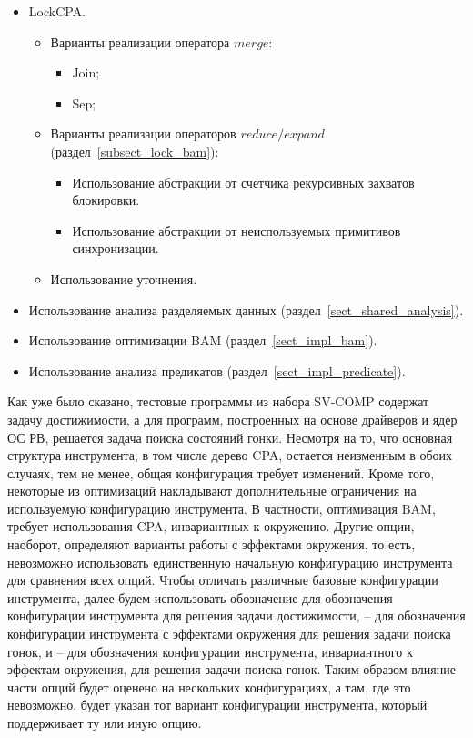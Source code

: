 \begin{itemize}
\item LockCPA.
\begin{itemize}
\item Варианты реализации оператора $merge$:
\begin{itemize}
\item Join;
\item Sep;
\end{itemize}
\item Варианты реализации операторов $reduce/expand$ (раздел~\ref{subsect_lock_bam}):
\begin{itemize}
\item Использование абстракции от счетчика рекурсивных захватов блокировки.
\item Использование абстракции от неиспользуемых примитивов синхронизации.
\end{itemize}
\item Использование уточнения.
\end{itemize}
\item Использование анализа разделяемых данных (раздел~\ref{sect_shared_analysis}).
\item Использование оптимизации BAM (раздел~\ref{sect_impl_bam}).
\item Использование анализа предикатов (раздел~\ref{sect_impl_predicate}).
\end{itemize}

Как уже было сказано, тестовые программы из набора SV-COMP содержат задачу достижимости, а для программ, построенных на основе драйверов и ядер ОС РВ, решается задача поиска состояний гонки.
Несмотря на то, что основная структура инструмента, в том числе дерево CPA, остается неизменным в обоих случаях, тем не менее, общая конфигурация требует изменений.
Кроме того, некоторые из оптимизаций накладывают дополнительные ограничения на используемую конфигурацию инструмента.
В частности, оптимизация BAM, требует использования CPA, инвариантных к окружению.
Другие опции, наоборот, определяют варианты работы с эффектами окружения, то есть, невозможно использовать единственную начальную конфигурацию инструмента для сравнения всех опций.
Чтобы отличать различные базовые конфигурации инструмента, далее будем использовать обозначение \textit{\theory} для обозначения конфигурации инструмента для решения задачи достижимости, \textit{\theoryraces} -- для обозначения конфигурации инструмента с эффектами окружения для решения задачи поиска гонок, и \textit{\combatmode} -- для обозначения конфигурации инструмента, инвариантного к эффектам окружения, для решения задачи поиска гонок.
Таким образом влияние части опций будет оценено на нескольких конфигурациях, а там, где это невозможно, будет указан тот вариант конфигурации инструмента, который поддерживает ту или иную опцию.

